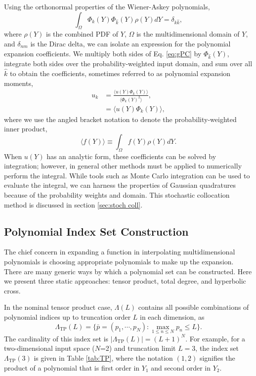 Using the orthonormal properties of the Wiener-Askey polynomials,
\begin{equation}
  \int_\Omega \Phi_k(Y)\Phi_{\hat k}(Y) \rho(Y) dY = \delta_{k\hat k},
\end{equation}
where $\rho(Y)$ is the combined PDF of $Y$, $\Omega$ is the multidimensional domain of $Y$, and $\delta_{nm}$
is the Dirac delta, we can isolate an expression for the polynomial expansion coefficients.
We multiply both sides of Eq. \ref{eq:gPC} by
$\Phi_{\hat k}(Y)$, integrate both sides over the probability-weighted input domain, and sum over all $\hat k$
to obtain the coefficients, sometimes referred to as polynomial expansion moments,
\begin{align}\label{eq:polycoeff}
  u_k &= \frac{\langle u(Y)\Phi_k(Y) \rangle}{\langle \Phi_k(Y)^2 \rangle},\\
      &= \langle u(Y)\Phi_k(Y) \rangle,
\end{align}
where we use the angled bracket notation to denote the probability-weighted inner product,
\begin{equation}
  \langle f(Y) \rangle \equiv \int_\Omega f(Y)\rho(Y) dY.
\end{equation}
When $u(Y)$ has an analytic form, these coefficients can be solved by integration; however, in general other
methods must be applied to numerically perform the integral.  While tools such as Monte Carlo integration can
be used to evaluate the integral, we can harness the properties of Gaussian quadratures because of the
probability weights and domain.  This stochastic collocation method is discussed in section \ref{sec:stoch
coll}.

\subsection{Polynomial Index Set Construction}\label{sec:index sets}
The chief concern in expanding a function in interpolating multidimensional polynomials is choosing appropriate polynomials to
make up the expansion.
There are many generic ways by which a polynomial set can be constructed.  Here we present three static
approaches: tensor
product, total degree, and hyperbolic cross.

In the nominal tensor
product case, $\Lambda(L)$ contains all possible combinations of polynomial indices up to truncation order $L$ in each
dimension, as
\begin{equation}
  \Lambda_\text{TP}(L)=\Big\{\bar p=(p_1,\cdots,p_N): \max_{1\leq n\leq N}p_n\leq L
\Big\}.
\end{equation}
The cardinality of this index set is $|\Lambda_\text{TP}(L)|=(L+1)^N$. For example, for a two-dimensional
input space ($N$=2) and truncation limit $L=3$, the index set $\Lambda_\text{TP}(3)$ is given in Table
\ref{tab:TP}, where the notation $(1,2)$ signifies the product of a polynomial that is first order in $Y_1$
and second order in $Y_2$.

